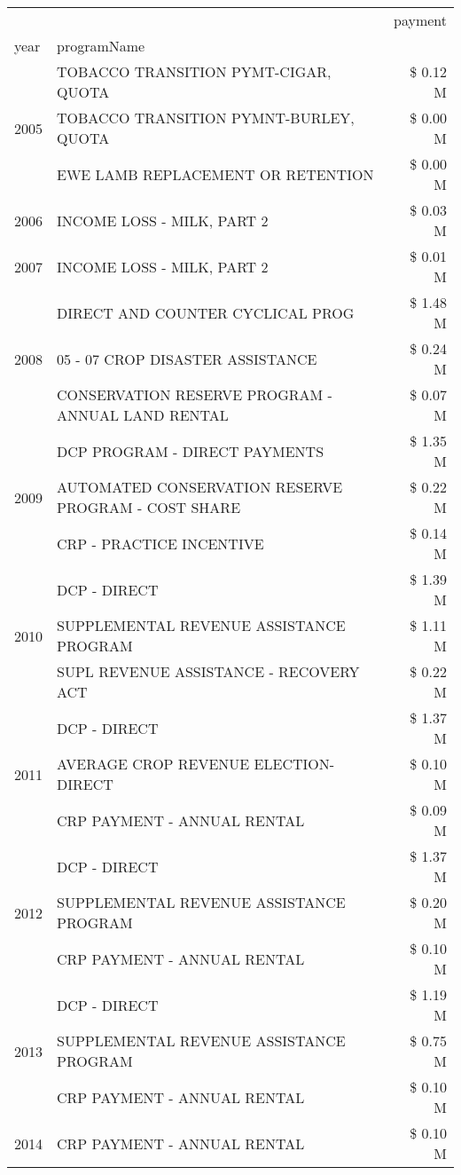 \begin{tabular}{llr}
\toprule
 &  & payment \\
year & programName &  \\
\midrule
\multirow[t]{3}{*}{2005} & TOBACCO TRANSITION PYMT-CIGAR, QUOTA & \$ 0.12 M \\
 & TOBACCO TRANSITION PYMNT-BURLEY, QUOTA & \$ 0.00 M \\
 & EWE LAMB REPLACEMENT OR RETENTION & \$ 0.00 M \\
\cline{1-3}
2006 & INCOME LOSS - MILK, PART 2 & \$ 0.03 M \\
\cline{1-3}
2007 & INCOME LOSS - MILK, PART 2 & \$ 0.01 M \\
\cline{1-3}
\multirow[t]{3}{*}{2008} & DIRECT AND COUNTER CYCLICAL PROG & \$ 1.48 M \\
 & 05 - 07 CROP DISASTER ASSISTANCE & \$ 0.24 M \\
 & CONSERVATION RESERVE PROGRAM - ANNUAL LAND RENTAL & \$ 0.07 M \\
\cline{1-3}
\multirow[t]{3}{*}{2009} & DCP PROGRAM - DIRECT PAYMENTS & \$ 1.35 M \\
 & AUTOMATED CONSERVATION RESERVE PROGRAM - COST SHARE & \$ 0.22 M \\
 & CRP - PRACTICE INCENTIVE & \$ 0.14 M \\
\cline{1-3}
\multirow[t]{3}{*}{2010} & DCP - DIRECT & \$ 1.39 M \\
 & SUPPLEMENTAL REVENUE ASSISTANCE PROGRAM & \$ 1.11 M \\
 & SUPL REVENUE ASSISTANCE - RECOVERY ACT & \$ 0.22 M \\
\cline{1-3}
\multirow[t]{3}{*}{2011} & DCP - DIRECT & \$ 1.37 M \\
 & AVERAGE CROP REVENUE ELECTION-DIRECT & \$ 0.10 M \\
 & CRP PAYMENT - ANNUAL RENTAL & \$ 0.09 M \\
\cline{1-3}
\multirow[t]{3}{*}{2012} & DCP - DIRECT & \$ 1.37 M \\
 & SUPPLEMENTAL REVENUE ASSISTANCE PROGRAM & \$ 0.20 M \\
 & CRP PAYMENT - ANNUAL RENTAL & \$ 0.10 M \\
\cline{1-3}
\multirow[t]{3}{*}{2013} & DCP - DIRECT & \$ 1.19 M \\
 & SUPPLEMENTAL REVENUE ASSISTANCE PROGRAM & \$ 0.75 M \\
 & CRP PAYMENT - ANNUAL RENTAL & \$ 0.10 M \\
\cline{1-3}
\multirow[t]{3}{*}{2014} & CRP PAYMENT - ANNUAL RENTAL & \$ 0.10 M \\

\end{tabular}

